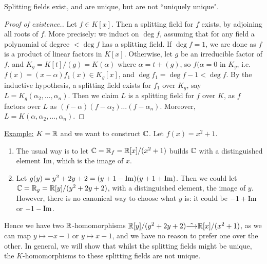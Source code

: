 \documentclass[a4paper, 10pt, twocolumn]{amsart}
\begin{document}
\begin{theorem}
Splitting fields exist, and are unique, but are not ``uniquely unique".
\end{theorem}
\begin{proof}[Proof of existence.]
Let $f \in K[x]$. Then a splitting field for $f$ exists, by adjoining all roots of $f$. More precisely: we induct on $\deg f$, assuming that for any field a polynomial of degree $< \deg f$ has a splitting field. If $\deg f = 1$, we are done as $f$ is a product of linear factors in $K[x]$. Otherwise, let $g$ be an irreducible factor of $f$, and $K_g = K[t]/(g) = K(\alpha)$ where $\alpha=t+(g)$, so $f(\alpha=0$ in $K_g$, i.e. $f(x)=(x-\alpha)f_1(x) \in K_g[x]$, and $\deg f_1 = \deg f -1 <\deg f$. By the inductive hypothesis, a splitting field exists for $f_1$ over $K_g$, say $L = K_g(\alpha_2, \ldots, \alpha_n)$. Then we claim $L$ is a splitting field for $f$ over $K$, as $f$ factors over $L$ as $(f-\alpha)(f-\alpha_2)\ldots(f-\alpha_n)$. Moreover, $L=K(\alpha,\alpha_2, \ldots, \alpha_n)$.
\end{proof}
\underline{Example:} $K=\mathbb{R}$ and we want to construct $\mathbb{C}$. Let $f(x) = x^2 +1$.
\begin{enumerate}
\item The usual way is to let $\mathbb{C} = \mathbb{R}_f = \mathbb{R}[x]/(x^2+1)$ builds $\mathbb{C}$ with a distinguished element $\operatorname{Im}$, which is the image of $x$.
\item Let $g(y) = y^2 + 2y + 2 = (y+1-\operatorname{Im})(y+1+\operatorname{Im})$. Then we could let $\mathbb{C} = \mathbb{R}_g = \mathbb{R}[y]/(y^2+2y+2)$, with a distinguished element, the image of $y$. However, there is no canonical way to choose what $y$ is: it could be $-1+\operatorname{Im}$ or $-1-\operatorname{Im}$. 
\end{enumerate}
 Hence we have two $\mathbb{R}$-homomorphisms $\mathbb{R}[y]/(y^2+2y+2) \tilde{\longrightarrow} \mathbb{R}[x]/(x^2+1)$, as we can map $y\mapsto -x-1$ or $y\mapsto x-1$, and we have no reason to prefer one over the other. In general, we will show that whilst the splitting fields might be unique, the $K$-homomorphisms to these splitting fields are not unique.
 
\end{document}
